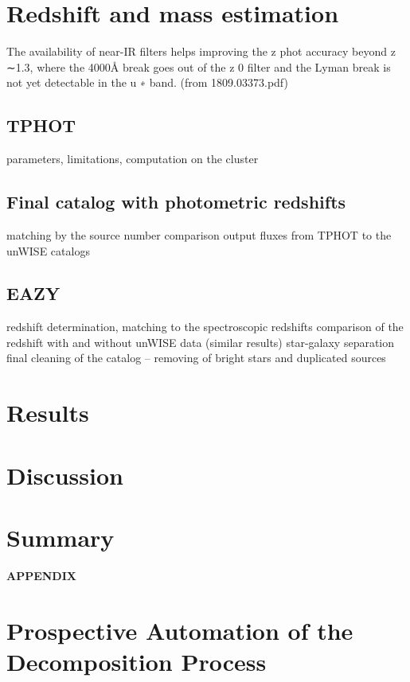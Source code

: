 \documentclass[numberedappendix,apj,twocolumn]{emulateapj}
\begin{document}
\section{Redshift and mass estimation}

The availability of near-IR filters helps improving the
z phot accuracy beyond z ∼1.3, where the 4000Å break goes out
of the z 0 filter and the Lyman break is not yet detectable in the
u ∗ band. (from 1809.03373.pdf)

\subsection{TPHOT} 
	parameters, limitations, computation on the cluster 

\subsection{Final catalog with photometric redshifts} 
	matching by the source number
	comparison output fluxes from TPHOT to the unWISE catalogs

\subsection{EAZY} 
	redshift determination, matching to the spectroscopic redshifts
	comparison of the redshift with and without unWISE data (similar results)
	star-galaxy separation
	final cleaning of the catalog – removing of bright stars and duplicated sources
	
\section{Results}

\section{Discussion}


\section{Summary}


\acknowledgements



%


%

\newpage
\centerline{ {\bf APPENDIX}}
\appendix
\section{Prospective Automation of the Decomposition Process}
\end{document}
